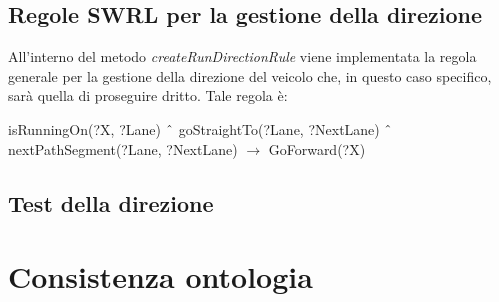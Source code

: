 \subsection{Regole SWRL per la gestione della direzione}\label{SWRLrundirection}
All'interno del metodo \textit{createRunDirectionRule} viene implementata la regola generale per la gestione della direzione del veicolo che, in questo caso specifico, sar\`a quella di proseguire dritto.
Tale regola \`e:
\begin{center}
isRunningOn(?X, ?Lane) $\char`\^$ goStraightTo(?Lane, ?NextLane) $\char`\^$ nextPathSegment(?Lane, ?NextLane) $\rightarrow$ GoForward(?X)
\end{center}
\subsection{Test della direzione}

\section{Consistenza ontologia}

